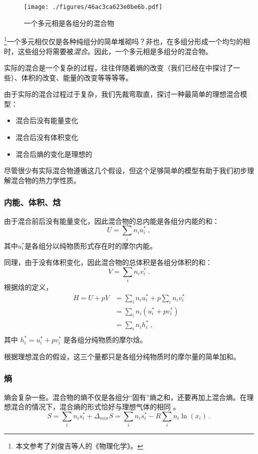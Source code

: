 

\begin{figure}[ht]
\centering
\texttt{[image: ./figures/46ac3ca623e0be6b.pdf]}
\caption{一个多元相是各组分的混合物} \label{fig_IMCPTV_1}
\end{figure}

\footnote{本文参考了刘俊吉等人的《物理化学》。}一个多元相仅仅是各种纯组分的简单堆砌吗？非也，在多组分形成一个均匀的相时，这些组分将需要被\textsl{混合}。因此，一个多元相是多组分的混合物。

实际的混合是一个复杂的过程，往往伴随着熵的改变（我们已经在中探讨了一些）、体积的改变、能量的改变等等等等。

由于实际的混合过程过于复杂，我们先裁弯取直，探讨一种最简单的理想混合模型：
\begin{itemize}
\item 混合后没有能量变化
\item 混合后没有体积变化
\item 混合后熵的变化是理想的
\end{itemize}
尽管很少有实际混合物遵循这几个假设，但这个足够简单的模型有助于我们初步理解混合物的热力学性质。

\subsubsection{内能、体积、焓}
由于混合前后没有能量变化，因此混合物的总内能是各组分内能的和：
$$
U = \sum_i n_i u_i^*~,
$$
其中$u_i^*$是各组分以纯物质形式存在时的摩尔内能。

同理，由于没有体积变化，因此混合物的总体积是各组分体积的和：
$$
V = \sum_i n_i v_i^*~.
$$
根据焓的定义，
$$
\begin{aligned}
H=U+pV&=\sum_i n_i u_i^*+p\sum_i n_i v_i^*\\
&=\sum_i n_i (u_i^*+p v_i^*)\\
&=\sum_i n_i h_i^*~,\\
\end{aligned}
$$
其中 $h^*_i = u_i^* + p v_i^*$ 是各组分纯物质的摩尔焓。

根据理想混合的假设，这三个量都只是各组分纯物质时的摩尔量的简单加和。

\subsubsection{熵}
熵会复杂一些。混合物的熵不仅是各组分“固有”熵之和，还要再加上混合熵。在理想混合的情况下，混合熵的形式恰好与理想气体的相同 。%
$$S = \sum_i n_i s_i^* + \Delta_{mix} S = \sum_i n_i s_i^* - R \sum_i n_i \ln (x_i)~. $$

